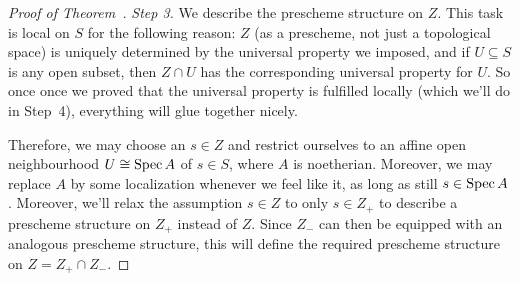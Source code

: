\documentclass[a4paper,parskip=half,numbers=enddot, DIV=12]{scrreprt}
\begin{document}
\begin{proof}[Proof of Theorem~]
	\emph{Step 3.} We describe the prescheme structure on $Z$. This task is local on $S$ for the following reason: $Z$ (as a prescheme, not just a topological space) is uniquely determined by the universal property we imposed, and if $U\subseteq S$ is any open subset, then $Z\cap U$ has the corresponding universal property for $U$. So once once we proved that the universal property is fulfilled locally (which we'll do in Step~4), everything will glue together nicely. 
	
	Therefore, we may choose an $s\in Z$ and restrict ourselves to an affine open neighbourhood $U\cong \operatorname{Spec} A$ of $s\in S$, where $A$ is noetherian. Moreover, we may replace $A$ by some localization whenever we feel like it, as long as still $s\in\operatorname{Spec} A$. Moreover, we'll relax the assumption $s\in Z$ to only $s\in Z_+$ to describe a prescheme structure on $Z_+$ instead of $Z$. Since $Z_-$ can then be equipped with an analogous prescheme structure, this will define the required prescheme structure on $Z=Z_+\cap Z_-$.
	

\end{proof}
\end{document}
